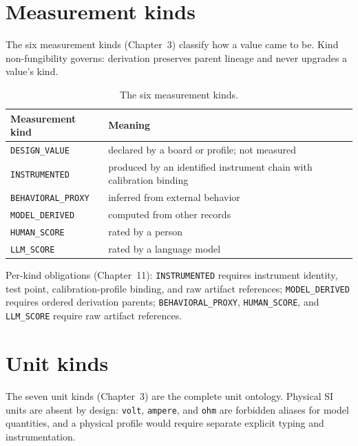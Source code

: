 \section{Measurement kinds}\label{enums:sec:measurement}

The six measurement kinds (Chapter~3) classify how a value came to be. Kind non-fungibility governs: derivation preserves parent lineage and never upgrades a value's kind.

\begin{table}[htbp]
\centering
\caption{The six measurement kinds.}\label{enums:tab:measurement}
\begin{tabular}{@{}ll@{}}
\toprule
Measurement kind & Meaning \\
\midrule
\texttt{DESIGN\_VALUE} & declared by a board or profile; not measured \\
\texttt{INSTRUMENTED} & produced by an identified instrument chain with calibration binding \\
\texttt{BEHAVIORAL\_PROXY} & inferred from external behavior \\
\texttt{MODEL\_DERIVED} & computed from other records \\
\texttt{HUMAN\_SCORE} & rated by a person \\
\texttt{LLM\_SCORE} & rated by a language model \\
\bottomrule
\end{tabular}
\end{table}

Per-kind obligations (Chapter~11): \texttt{INSTRUMENTED} requires instrument identity, test point, calibration-profile binding, and raw artifact references; \texttt{MODEL\_DERIVED} requires ordered derivation parents; \texttt{BEHAVIORAL\_PROXY}, \texttt{HUMAN\_SCORE}, and \texttt{LLM\_SCORE} require raw artifact references.

\section{Unit kinds}\label{enums:sec:units}

The seven unit kinds (Chapter~3) are the complete unit ontology. Physical SI units are absent by design: \texttt{volt}, \texttt{ampere}, and \texttt{ohm} are forbidden aliases for model quantities, and a physical profile would require separate explicit typing and instrumentation.

